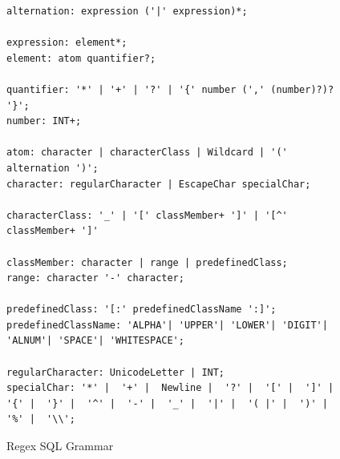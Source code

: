 \begin{figure}[htbp]
\begin{verbatim}
alternation: expression ('|' expression)*;

expression: element*;
element: atom quantifier?;

quantifier: '*' | '+' | '?' | '{' number (',' (number)?)? '}';
number: INT+;

atom: character | characterClass | Wildcard | '(' alternation ')';
character: regularCharacter | EscapeChar specialChar;

characterClass: '_' | '[' classMember+ ']' | '[^' classMember+ ']'

classMember: character | range | predefinedClass;
range: character '-' character;

predefinedClass: '[:' predefinedClassName ':]';
predefinedClassName: 'ALPHA'| 'UPPER'| 'LOWER'| 'DIGIT'| 'ALNUM'| 'SPACE'| 'WHITESPACE';

regularCharacter: UnicodeLetter | INT;
specialChar: '*' |  '+' |  Newline |  '?' |  '[' |  ']' |  '{' |  '}' |  '^' |  '-' |  '_' |  '|' |  '( |' |  ')' |  '%' |  '\\';

\end{verbatim}
\caption[Parser Grammar]{Regex SQL Grammar \cite{2022Firebird}}\label{fig:zregexgrammar}
\end{figure}

